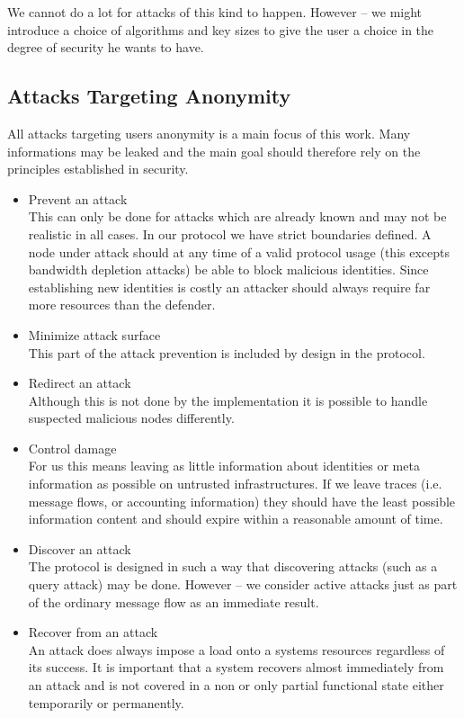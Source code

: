 We cannot do a lot for attacks of this kind to happen. However -- we might introduce a choice of algorithms and key sizes to give the user a choice in the degree of security he wants to have.

\subsection{Attacks Targeting Anonymity}
All attacks targeting users anonymity is a main focus of this work. Many informations may be leaked and the main goal should therefore rely on the principles established in security.

\begin{itemize}
\item Prevent an attack\\
      This can only be done for attacks which are already known and may not be realistic in all cases. In our protocol we have strict boundaries defined. A node under attack should at any time of a valid protocol usage (this excepts bandwidth depletion attacks) be able to block malicious identities. Since establishing new identities is costly an attacker should always require far more resources than the defender.
\item Minimize attack surface\\
      This part of the attack prevention is included by design in the protocol.
\item Redirect an attack\\
	  Although this is not done by the implementation it is possible to handle suspected malicious nodes differently.
\item Control damage\\
      For us this means leaving as little information about identities or meta information as possible on untrusted infrastructures. If we leave traces (i.e. message flows, or accounting information) they should have the least possible information content and should expire within a reasonable amount of time.
\item Discover an attack\\
      The protocol is designed in such a way that discovering attacks (such as a query attack) may be done. However -- we consider active attacks just as part of the ordinary message flow as an immediate result. 
\item Recover from an attack\\
      An attack does always impose a load onto a systems resources regardless of its success. It is important that a system recovers almost immediately from an attack and is not covered in a non or only partial functional state either temporarily or permanently.
\end{itemize}

